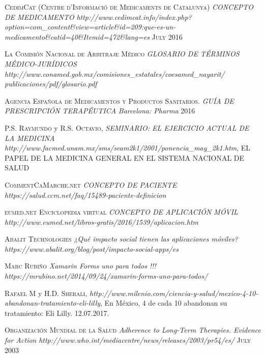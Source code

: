 
\begin{thebibliography}{X}
	
	 \textsc{CedimCat (Centre d'Informació de Medicaments de Catalunya)} \textit{CONCEPTO DE MEDICAMENTO} \textit{http://www.cedimcat.info/index.php?option=com\_content\&view=article\&id=209:que-es-un-medicamento\&catid=40\&Itemid=472\&lang=es} \textsc{July 2016}
	
	 \textsc{La Comisión Nacional de Arbitraje Médico} \textit{GLOSARIO DE TÉRMINOS MÉDICO-JURÍDICOS} \textit{http://www.conamed.gob.mx/comisiones\_estatales/coesamed\_nayarit/
publicaciones/pdf/glosario.pdf}
	
	 \textsc{Agencia Española de Medicamentos y Productos Sanitarios.} \textit{GUÍA DE PRESCRIPCIÓN TERAPÉUTICA} \textit{Barcelona: Pharma} \textsc{2016}
	
	 \textsc{P.S. Raymundo} y \textsc{R.S. Octavio}, \textit{SEMINARIO: EL EJERCICIO ACTUAL DE LA MEDICINA}
	\textit{http://www.facmed.unam.mx/sms/seam2k1/2001/ponencia\_may\_2k1.htm}, EL PAPEL DE LA MEDICINA GENERAL EN EL SISTEMA NACIONAL DE SALUD
	
	 \textsc{CommentCaMarche.net} \textit{CONCEPTO DE PACIENTE} \textit{https://salud.ccm.net/faq/15489-paciente-definicion}
	
	 \textsc{eumed.net Enciclopedia virtual} \textit{CONCEPTO DE APLICACIÓN MÓVIL} \textit{http://www.eumed.net/libros-gratis/2016/1539/aplicacion.htm}
	
	 \textsc{Abalit Technologies} \textit{¿Qué impacto social tienen las aplicaciones móviles?} \textit{https://www.abalit.org/blog/post/impacto-social-apps/es}
	
	 \textsc{Marc Rubiño} \textit{Xamarin Forms uno para todos !!!} \textit{https://mrubino.net/2014/09/24/xamarin-forms-uno-para-todos/}
	
	 \textsc{Rafael M} y \textsc{H.D. Sherali},
	\textit{http://www.milenio.com/ciencia-y-salud/mexico-4-10-abandonan-tratamiento-eli-lilly},  En México, 4 de cada 10 abandonan su tratamiento: Eli Lilly. 12.07.2017.
	
	 \textsc{Organización Mundial de la Salud} \textit{Adherence to Long-Term Therapies. Evidence for Action} \textit{http://www.who.int/mediacentre/news/releases/2003/pr54/es/} \textsc{July 2003}
	

\end{thebibliography}
